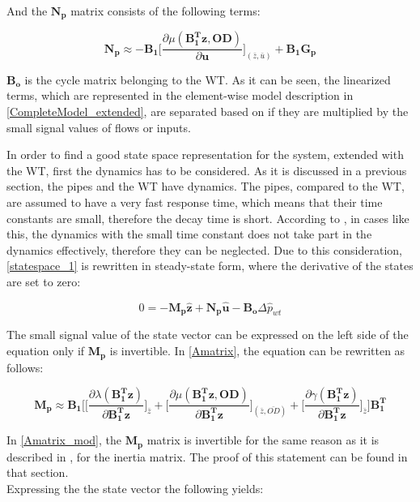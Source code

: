 And the $\bm{N_p}$ matrix consists of the following terms:

\begin{equation}
  \bm{N_p} \approx -\bm{B_1} \bigg[ \frac{\partial{\mu(\bm{{B_1^{T}}}\bm{z}, \bm{OD})}}{{\partial{\bm{u}}}}  \bigg]_{(\bar{z}, \bar{u})} + \bm{B_1}\bm{G_p}  
\label{Bumatrix}
\end{equation}

$\bm{B_o}$ is the cycle matrix belonging to the WT. As it can be seen, the linearized terms, which are represented in the element-wise model description in \eqref{CompleteModel_extended}, are separated based on if they are multiplied by the small signal values of flows or inputs. 

In order to find a good state space representation for the system, extended with the WT, first the dynamics has to be considered. As it is discussed in a previous section, the pipes and the WT have dynamics. The pipes, compared to the WT, are assumed to have a very fast response time, which means that their time constants are small, therefore the decay time is short. According to \citep{franklin1994feedback}, in cases like this, the dynamics with the small time constant does not take part in the dynamics effectively, therefore they can be neglected. Due to this consideration, \eqref{statespace_1} is rewritten in steady-state form, where the derivative of the states are set to zero:

\begin{equation}
 0 = -\bm{M_p} \bm{\hat{z}} + \bm{N_p} \bm{\hat{u}} -\bm{B_o} \Delta \hat{p}_{wt}    
 \label{statespace_2}
\end{equation}

The small signal value of the state vector can be expressed on the left side of the equation only if $\bm{M_p}$ is invertible. In \eqref{Amatrix}, the equation can be rewritten as follows: 

\begin{equation}
  \bm{M_p} \approx \bm{B_1}\Bigg[ \bigg[ \frac{\partial{\lambda(\bm{{B_1^{T}}}\bm{z})}}{{\partial{\bm{{B_1^{T}}}\bm{z}}}}   \bigg]_{\bar{z}} +
\bigg[ \frac{\partial{\mu(\bm{{B_1^{T}}}\bm{z}, \bm{OD})}}{{\partial{\bm{{B_1^{T}}}\bm{z}}}}  \bigg]_{(\bar{z}, \bar{OD})} +  \bigg[ \frac{\partial{\gamma(\bm{{B_1^{T}}}\bm{z})}}{{\partial{\bm{{B_1^{T}}}\bm{z}}}}   \bigg]_{\bar{z}}\Bigg] \bm{{B_1^{T}}}
\label{Amatrix_mod}
\end{equation}

In \eqref{Amatrix_mod}, the $\bm{M_p}$ matrix is invertible for the same reason as it is described in , for the inertia matrix. The proof of this statement can be found in that section. 
\\
Expressing the the state vector the following yields:


